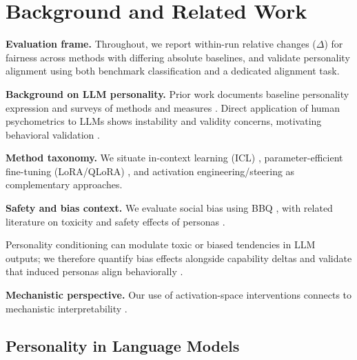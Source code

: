 \section{Background and Related Work}
\label{app:background}
\noindent\textbf{Evaluation frame.} Throughout, we report within-run relative changes (\(\Delta\)) for fairness across methods with differing absolute baselines, and validate personality alignment using both benchmark classification and a dedicated alignment task.

\noindent\textbf{Background on LLM personality.} Prior work documents baseline personality expression and surveys of methods and measures \citep{serapio-garcia-etal-2023-personality-traits-llms,jiang-2024-personallm-naacl,wen-2024-llm-personality-survey}. Direct application of human psychometrics to LLMs shows instability and validity concerns, motivating behavioral validation \citep{gupta-2024-psychometric-validity-llms,song-2023-stability-llm-personality}.

\noindent\textbf{Method taxonomy.} We situate in-context learning (ICL) \citep{mao-2023-editing-personality}, parameter-efficient fine-tuning (LoRA/QLoRA) \citep{hu-etal-2022-lora,dettmers-2023-qlora}, and activation engineering/steering \citep{turner-etal-2023-activation-steering,panickssery-2024-contrastive-activation-addition,chen-2025-persona-vectors} as complementary approaches.

\noindent\textbf{Safety and bias context.} We evaluate social bias using BBQ \citep{parrish-etal-2022-bbq}, with related literature on toxicity and safety effects of personas \citep{gehman-2020-realtoxicityprompts,zhang-2024-better-angels,wang-2025-personality-bias-toxicity,durmus-2024-evaluating-feature-steering}.

Personality conditioning can modulate toxic or biased tendencies in LLM outputs; we therefore quantify bias effects alongside capability deltas and validate that induced personas align behaviorally \citep{gehman-2020-realtoxicityprompts,wang-2025-personality-bias-toxicity}.

\noindent\textbf{Mechanistic perspective.} Our use of activation-space interventions connects to mechanistic interpretability \citep{olah-2020-circuits,bricken-2023-monosemanticity,elhage-2022-superposition,rai-2024-mechinterp-review}.

\subsection{Personality in Language Models}

